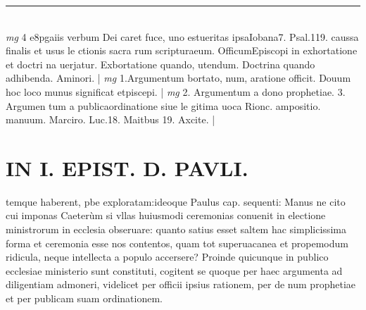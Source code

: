 \documentclass{article}
\begin{document}
\begin{pages}
\vspace{0.5cm}\noindent
\vspace{0.2cm}\rule{1cm}{0.2pt}\\ 
\hspace{0.2cm}\textit{mg}
\footnotesize 4 e8pgaiis verbum Dei caret fuce, uno estueritas ipsaIobana7. Psal.119. caussa finalis et usus le ctionis sacra rum scripturaeum. OfficumEpiscopi in exhortatione et doctri na uerjatur. Exbortatione quando, utendum. Doctrina quando adhibenda. Aminori. 
\normalsize| 
\hspace{0.2cm}\textit{mg}
\footnotesize 1.Argumentum bortato, num, aratione officit. Douum hoc loco munus significat etpiscepi. 
\normalsize| 
\hspace{0.2cm}\textit{mg}
\footnotesize 2. Argumentum a dono prophetiae. 3. Argumen tum a publicaordinatione siue le gitima uoca Rionc. ampositio. manuum. Marciro. Luc.18. Maitbus 19. Axcite. 
\normalsize| 
\section*{IN I. EPIST. D. PAVLI. }
\marginpar{[ p.103 ]}\pstart temque haberent, pbe exploratam:ideoque Paulus cap. sequenti: Manus ne cito cui imponas  \pend\pstart Caeterùm si vllas huiusmodi ceremonias conuenit in electione ministrorum in ecclesia obseruare: quanto satius esset saltem hac simplicissima forma et ceremonia esse nos contentos, quam tot superuacanea et propemodum ridicula, neque intellecta a populo accersere? Proinde quicunque in publico ecclesiae ministerio sunt constituti, cogitent se quoque  per haec argumenta ad diligentiam admoneri, videlicet per officii ipsius rationem, per de num prophetiae et per publicam suam ordinationem.  \pend
{}
{}

\end{pages}
\end{document}
